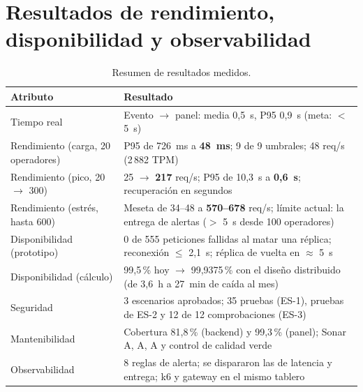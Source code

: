 \section{Resultados de rendimiento, disponibilidad y observabilidad}
\begin{table}[H]
\centering\small
\caption{Resumen de resultados medidos.}\label{tab:resumen}
\begin{tabularx}{\textwidth}{lY}
\toprule
\textbf{Atributo} & \textbf{Resultado} \\
\midrule
Tiempo real & Evento $\rightarrow$ panel: media 0,5~s, P95 0,9~s (meta: $<$ 5~s) \\
Rendimiento (carga, 20 operadores) & P95 de 726~ms a \textbf{48~ms}; 9 de 9 umbrales; 48 req/s (2\,882 TPM) \\
Rendimiento (pico, 20 $\rightarrow$ 300) & 25 $\rightarrow$ \textbf{217} req/s; P95 de 10,3~s a \textbf{0,6~s}; recuperación en segundos \\
Rendimiento (estrés, hasta 600) & Meseta de 34--48 a \textbf{570--678} req/s; límite actual: la entrega de alertas ($>$ 5~s desde 100 operadores) \\
Disponibilidad (prototipo) & 0 de 555 peticiones fallidas al matar una réplica; reconexión $\leq$ 2,1~s; réplica de vuelta en $\approx$ 5~s \\
Disponibilidad (cálculo) & 99,5\,\% hoy $\rightarrow$ 99,9375\,\% con el diseño distribuido (de 3,6~h a 27~min de caída al mes) \\
Seguridad & 3 escenarios aprobados; 35 pruebas (ES-1), pruebas de ES-2 y 12 de 12 comprobaciones (ES-3) \\
Mantenibilidad & Cobertura 81,8\,\% (backend) y 99,3\,\% (panel); Sonar A, A, A y control de calidad verde \\
Observabilidad & 8 reglas de alerta; se dispararon las de latencia y entrega; k6 y gateway en el mismo tablero \\
\bottomrule
\end{tabularx}
\end{table}
